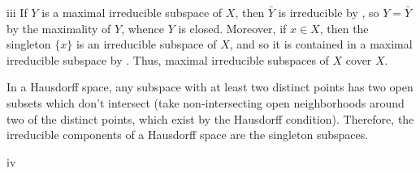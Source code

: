 \begin{partsolution}{iii}
If \(Y\) is a maximal irreducible subspace of \(X\), then \(\bar{Y}\) is irreducible by , so \(Y = \bar{Y}\) by the maximality of \(Y\), whence \(Y\) is closed.
Moreover, if \(x \in X\), then the singleton \(\{x\}\) is an irreducible subspace of \(X\), and so it is contained in a maximal irreducible subspace by .
Thus, maximal irreducible subspaces of \(X\) cover \(X\).

In a Hausdorff space, any subspace with at least two distinct points has two open subsets which don't intersect (take non-intersecting open neighborhoods around two of the distinct points, which exist by the Hausdorff condition).
Therefore, the irreducible components of a Hausdorff space are the singleton subspaces.
\end{partsolution}

\begin{partsolution}{iv}

\end{partsolution}